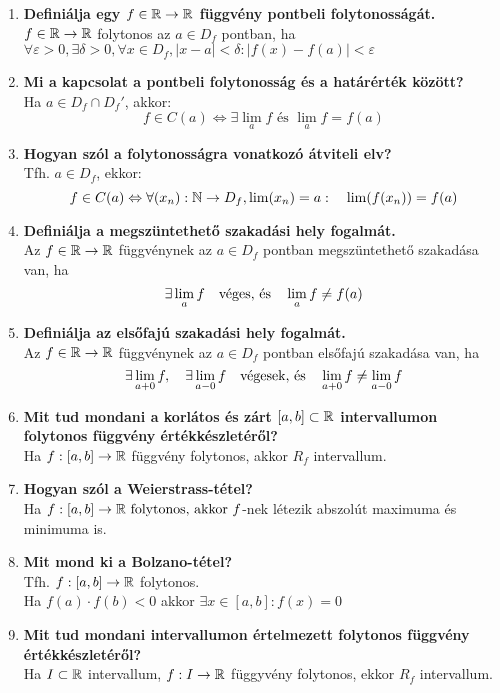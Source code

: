 \documentclass[a4paper,11pt]{article}
\begin{document}
\begin{enumerate}
	\item \textbf{Definiálja egy $f\in\displaystyle\mathbb{R}\to\mathbb{R}$ függvény pontbeli folytonosságát.}\\[0.2cm] $f\in\mathbb{R}\to\mathbb{R}$ folytonos az $a\in D_f$ pontban, ha\\[0.2cm] $\forall\varepsilon>0,\exists\delta>0,\forall x\in D_f, |x-a|<\delta : |f(x)-f(a)|<\varepsilon$
	\item \textbf{Mi a kapcsolat a pontbeli folytonosság és a határérték között?}\\[0.2cm]Ha $a\in D_f\cap D_f'$, akkor: \[ f\in C(a)\Leftrightarrow \exists\lim_a f \text{ és } \lim_a f=f(a)\]
	\item \textbf{Hogyan szól a folytonosságra vonatkozó átviteli elv?}\\[0.2cm] Tfh. $a\in D_f$, ekkor: \[f\in C(a)\Leftrightarrow\forall(x_n):\mathbb{N}\to D_f, \lim(x_n)=a:\quad\lim(f(x_n))=f(a)\]
	\item \textbf{Definiálja a megszüntethető szakadási hely fogalmát.}\\[0.1cm]
	Az $f\in\mathbb{R}\to\mathbb{R}$ függvénynek az $a\in D_f$ pontban megszüntethető szakadása van, ha \[ \exists\lim_{a} f\text{\quad véges, és\quad } \lim_a f\not=f(a)\]
	\item \textbf{Definiálja az elsőfajú szakadási hely fogalmát.}\\[0.1cm]
	Az $f\in\mathbb{R}\to\mathbb{R}$ függvénynek az $a\in D_f$ pontban elsőfajú szakadása van, ha \[ \exists \lim_{a+0} f,\quad \exists\lim_{a-0}f \text{\quad végesek, és\quad } \lim_{a+0} f \not= \lim_{a-0}f \]
	\item \textbf{Mit tud mondani a korlátos és zárt $[a,b]\subset\mathbb{R}$ intervallumon folytonos függvény értékkészletéről?}\\[0.1cm]Ha $f:[a,b]\to\mathbb{R}$ függvény folytonos, akkor $R_f$ intervallum.
	\item \textbf{Hogyan szól a Weierstrass-tétel?}\\[0.1cm]
	Ha $ f:[a,b]\to\mathbb{R}\text{ folytonos, akkor } f$-nek létezik abszolút maximuma és minimuma is.
	\item \textbf{Mit mond ki a Bolzano-tétel?}\\[0.1cm]
	Tfh. $f: [a,b] \to \mathbb{R}$ folytonos.\\[0.1cm]Ha $f(a)\cdot f(b) < 0$ akkor $\exists x \in [a,b]: f(x) = 0$
	\item \textbf{Mit tud mondani intervallumon értelmezett folytonos függvény értékkészletéről?}\\[0.1cm]Ha $I\subset\mathbb{R}$ intervallum, $f: I \to\mathbb{R}$ függyvény folytonos, ekkor $R_f$ intervallum.

\end{enumerate}
\end{document}
